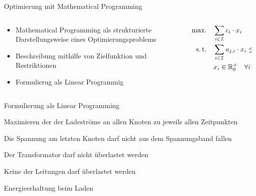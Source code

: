 \documentclass[aspectratio=169]{beamer}
\begin{document}
\begin{frame}{Optimierung mit Mathematical Programming}
	\begin{columns}
		\begin{column}{.6\textwidth}
			\begin{itemize}
				\item Mathematical Programming als strukturierte 
				Darstellungsweise eines Optimierungsproblems
				\item Beschreibung mithilfe von Zielfunktion und Restriktionen
				\item Formulierug als Linear Programmig
			\end{itemize}
		\end{column}
		\begin{column}{.4\textwidth}
			\begin{align*}
				\begin{split}
		\text{max.}\quad&\sum_{i\in\mathcal{I}}c_i\cdot x_i \\
		\text{s.\,t.}\quad&\sum_{i\in\mathcal{I}}a_{j,i}\cdot x_i\leq b_j\quad
		\forall j\in\mathcal{J} \\
		& x_i\in\mathbb{R}_0^+\quad\forall i\in\mathcal{I}
				\end{split}
			\end{align*}
		\end{column}
	\end{columns}
\end{frame}


\begin{frame}{Formulierung als Linear Programming}
	\begin{description}[<+->]
		\item[Zielfunktion] Maximieren der der Ladeströme an allen Knoten zu 
		jeweils allen Zeitpunkten
		\item[Restriktion] Die Spannung am letzten Knoten darf nicht aus dem
		Spannungsband fallen
		\item[Restriktion] Der Transformator darf nicht überlastet werden
		\item[Restriktion] Keine der Leitungen darf überlastet werden
		\item[Restriktion] Energieerhaltung beim Laden
	\end{description}
\end{frame}
\end{document}
